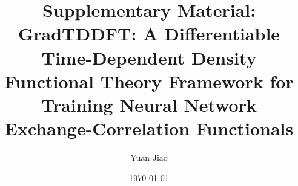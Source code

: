 \documentclass[%
 aip,
 jmp,
 amsmath,amssymb,
 reprint, onecolumn
]{revtex4-1}
\begin{document}
\title{Supplementary Material: GradTDDFT: A Differentiable
Time-Dependent Density Functional Theory Framework for Training
Neural Network Exchange-Correlation Functionals}

\author{Yuan Jiao}

\date{\today}

\maketitle




\end{document}
